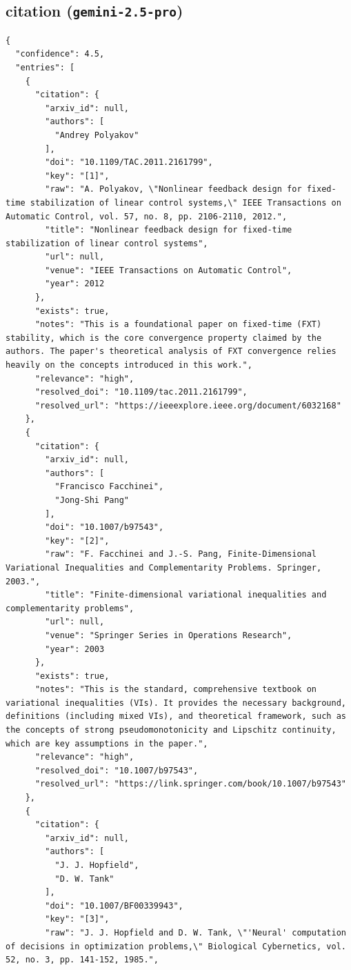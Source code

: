 \documentclass[11pt]{article}
\begin{document}
\subsection*{citation (\texttt{gemini-2.5-pro})}
\begin{verbatim}
{
  "confidence": 4.5,
  "entries": [
    {
      "citation": {
        "arxiv_id": null,
        "authors": [
          "Andrey Polyakov"
        ],
        "doi": "10.1109/TAC.2011.2161799",
        "key": "[1]",
        "raw": "A. Polyakov, \"Nonlinear feedback design for fixed-time stabilization of linear control systems,\" IEEE Transactions on Automatic Control, vol. 57, no. 8, pp. 2106-2110, 2012.",
        "title": "Nonlinear feedback design for fixed-time stabilization of linear control systems",
        "url": null,
        "venue": "IEEE Transactions on Automatic Control",
        "year": 2012
      },
      "exists": true,
      "notes": "This is a foundational paper on fixed-time (FXT) stability, which is the core convergence property claimed by the authors. The paper's theoretical analysis of FXT convergence relies heavily on the concepts introduced in this work.",
      "relevance": "high",
      "resolved_doi": "10.1109/tac.2011.2161799",
      "resolved_url": "https://ieeexplore.ieee.org/document/6032168"
    },
    {
      "citation": {
        "arxiv_id": null,
        "authors": [
          "Francisco Facchinei",
          "Jong-Shi Pang"
        ],
        "doi": "10.1007/b97543",
        "key": "[2]",
        "raw": "F. Facchinei and J.-S. Pang, Finite-Dimensional Variational Inequalities and Complementarity Problems. Springer, 2003.",
        "title": "Finite-dimensional variational inequalities and complementarity problems",
        "url": null,
        "venue": "Springer Series in Operations Research",
        "year": 2003
      },
      "exists": true,
      "notes": "This is the standard, comprehensive textbook on variational inequalities (VIs). It provides the necessary background, definitions (including mixed VIs), and theoretical framework, such as the concepts of strong pseudomonotonicity and Lipschitz continuity, which are key assumptions in the paper.",
      "relevance": "high",
      "resolved_doi": "10.1007/b97543",
      "resolved_url": "https://link.springer.com/book/10.1007/b97543"
    },
    {
      "citation": {
        "arxiv_id": null,
        "authors": [
          "J. J. Hopfield",
          "D. W. Tank"
        ],
        "doi": "10.1007/BF00339943",
        "key": "[3]",
        "raw": "J. J. Hopfield and D. W. Tank, \"'Neural' computation of decisions in optimization problems,\" Biological Cybernetics, vol. 52, no. 3, pp. 141-152, 1985.",

\end{verbatim}
\end{document}
